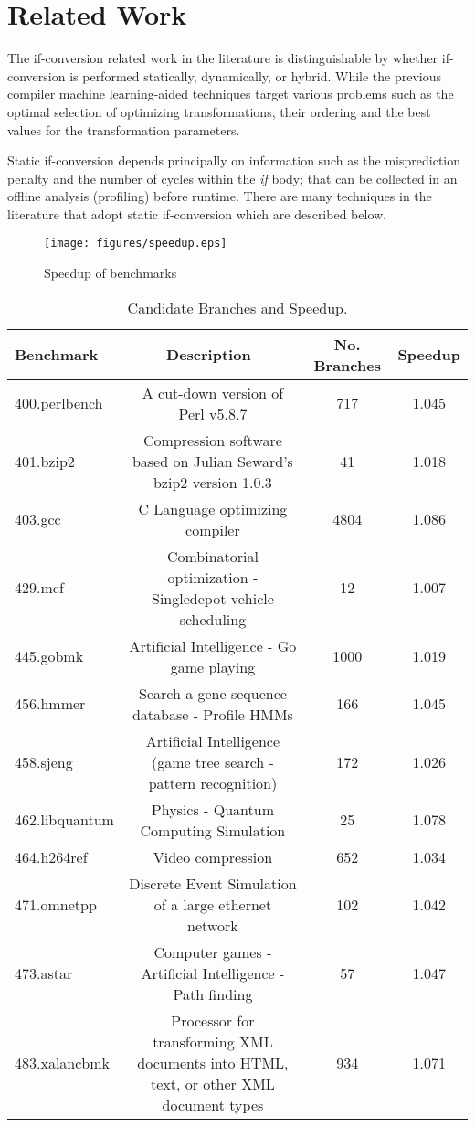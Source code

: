 \documentclass[preprint,nocopyrightspace]{sigplanconf}
\begin{document}
\section{Related Work}
\label{related}
The if-conversion related work in the literature is distinguishable by whether if-conversion is performed statically, dynamically, or hybrid. While the previous compiler machine learning-aided techniques target various problems such as the optimal selection of optimizing transformations, their ordering and the best values for the transformation parameters.

Static if-conversion depends principally on information such as the misprediction penalty and the number of cycles within the \textit{if} body; that can be collected in an offline analysis  (profiling) before runtime. 
There are many techniques in the literature that adopt static if-conversion which are described below. 
\begin{figure*}[!t]
  \centering
  \texttt{[image: figures/speedup.eps]}
  \caption{Speedup of benchmarks}\label{fig:speedup}
\end{figure*}
 \begin{table*}[!ht]
\centering
\begin{tabular}{@{}l c c c @{}}
\toprule
Benchmark&Description~\cite{henning2006spec}&No. Branches& Speedup\\

\midrule
400.perlbench&A cut-down version of Perl
v5.8.7&717&1.045\\
401.bzip2&Compression software based on Julian Seward's bzip2
version 1.0.3&41&1.018\\
403.gcc&C Language optimizing compiler&4804&1.086\\
429.mcf&Combinatorial optimization - Singledepot
vehicle scheduling&12&1.007\\
445.gobmk&Artificial Intelligence - Go game playing&1000&1.019\\
456.hmmer& Search a gene sequence database - Profile HMMs&166&1.045\\
458.sjeng&Artificial Intelligence (game tree search
- pattern recognition)&172&1.026\\
462.libquantum& Physics - Quantum Computing Simulation&25&1.078\\
464.h264ref&Video compression&652&1.034\\
471.omnetpp&Discrete Event Simulation of a large ethernet network&102&1.042\\
473.astar&Computer games - Artificial Intelligence -
Path finding&57&1.047\\
483.xalancbmk& Processor for transforming XML
documents into HTML, text, or other XML document types&934&1.071\\
\bottomrule
\end{tabular}
 \caption{Candidate Branches and Speedup.}\label{tab:results}
\end{table*} 
\end{document}
